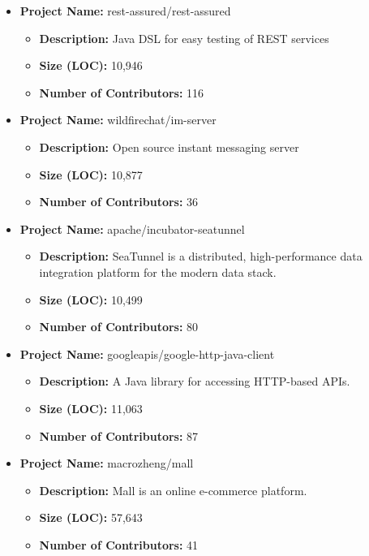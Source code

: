 \documentclass[conference]{IEEEtran}
\begin{document}
\begin{itemize}
            \item \textbf{Project Name:} rest-assured/rest-assured
            \begin{itemize}
                \item \textbf{Description:} Java DSL for easy testing of REST services
                \item \textbf{Size (LOC):} 10,946
                \item \textbf{Number of Contributors:} 116
            \end{itemize}
        
            \item \textbf{Project Name:} wildfirechat/im-server
            \begin{itemize}
                \item \textbf{Description:} Open source instant messaging server
                \item \textbf{Size (LOC):} 10,877
                \item \textbf{Number of Contributors:} 36
            \end{itemize}
        
            \item \textbf{Project Name:} apache/incubator-seatunnel
            \begin{itemize}
                \item \textbf{Description:} SeaTunnel is a distributed, high-performance data integration platform for the modern data stack.
                \item \textbf{Size (LOC):} 10,499
                \item \textbf{Number of Contributors:} 80
            \end{itemize}
        
            \item \textbf{Project Name:} googleapis/google-http-java-client
            \begin{itemize}
                \item \textbf{Description:} A Java library for accessing HTTP-based APIs.
                \item \textbf{Size (LOC):} 11,063
                \item \textbf{Number of Contributors:} 87
            \end{itemize}
        
            \item \textbf{Project Name:} macrozheng/mall
            \begin{itemize}
                \item \textbf{Description:} Mall is an online e-commerce platform.
                \item \textbf{Size (LOC):} 57,643
                \item \textbf{Number of Contributors:} 41
            \end{itemize}
        
        \end{itemize}
        
\end{document}
